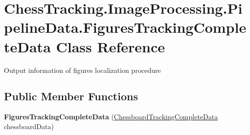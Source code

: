 \hypertarget{class_chess_tracking_1_1_image_processing_1_1_pipeline_data_1_1_figures_tracking_complete_data}{}\section{Chess\+Tracking.\+Image\+Processing.\+Pipeline\+Data.\+Figures\+Tracking\+Complete\+Data Class Reference}
\label{class_chess_tracking_1_1_image_processing_1_1_pipeline_data_1_1_figures_tracking_complete_data}


Output information of figures localization procedure  


\subsection*{Public Member Functions}
\begin{DoxyCompactItemize}
\item 
\mbox{\label{class_chess_tracking_1_1_image_processing_1_1_pipeline_data_1_1_figures_tracking_complete_data_ab75a410fe046a0f44d561c4fb2e34376}} 
{\bfseries Figures\+Tracking\+Complete\+Data} (\mbox{\hyperlink{class_chess_tracking_1_1_image_processing_1_1_pipeline_data_1_1_chessboard_tracking_complete_data}{Chessboard\+Tracking\+Complete\+Data}} chessboard\+Data)
\end{DoxyCompactItemize}
